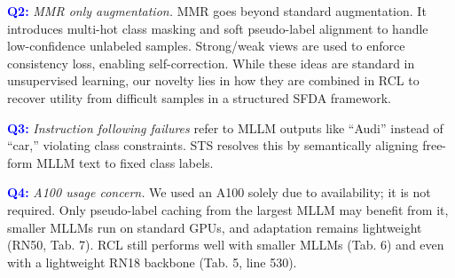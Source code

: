 \documentclass[10pt,twocolumn,letterpaper]{article}
\begin{document}

\textcolor{blue}{\textbf{Q2:}} \textit{MMR only augmentation.}
MMR goes beyond standard augmentation. It introduces multi-hot class masking and soft pseudo-label alignment to handle low-confidence unlabeled samples. Strong/weak views are used to enforce consistency loss, enabling self-correction. While these ideas are standard in unsupervised learning, our novelty lies in how they are combined in RCL to recover utility from difficult samples in a structured SFDA framework.

\textcolor{blue}{\textbf{Q3:}} \textit{Instruction following failures }
refer to MLLM outputs like “Audi” instead of “car,” violating class constraints. STS resolves this by semantically aligning free-form MLLM text to fixed class labels. 

\textcolor{blue}{\textbf{Q4:}} \textit{A100 usage concern.}
We used an A100 solely due to availability; it is not required. Only pseudo-label caching from the largest MLLM may benefit from it, smaller MLLMs run on standard GPUs, and adaptation remains lightweight (RN50, Tab. 7). RCL still performs well with smaller MLLMs (Tab. 6) and even with a lightweight RN18 backbone (Tab. 5, line 530).

\end{document}

